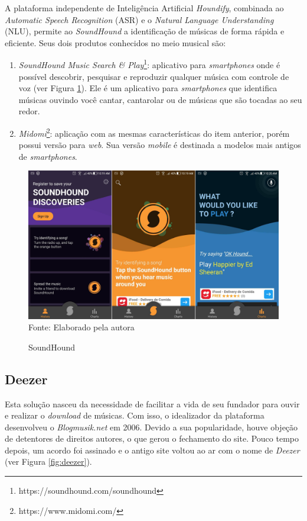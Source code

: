 A plataforma independente de Inteligência Artificial \textit{Houndify}, combinada ao \textit{Automatic Speech Recognition} (ASR) e o \textit{Natural Language Understanding} (NLU), permite ao \textit{SoundHound} a identificação de músicas de forma rápida e eficiente. Seus dois produtos conhecidos no meio musical são:

\begin{enumerate}
    \item \textit{SoundHound Music Search \& Play}\footnote{https://soundhound.com/soundhound}: aplicativo para \textit{smartphones} onde é possível descobrir, pesquisar e reproduzir qualquer música com controle de voz (ver Figura \ref{fig:soundHound}). Ele é um aplicativo para \textit{smartphones} que identifica músicas ouvindo você cantar, cantarolar ou de músicas que são tocadas ao seu redor.
    \item \textit{Midomi}\footnote{https://www.midomi.com/}: aplicação com as mesmas características do item anterior, porém possui versão para \textit{web}. Sua  versão \textit{mobile} é destinada a modelos mais antigos de \textit{smartphones}.
\end{enumerate}

\begin{figure}[!htb]
   \centering
   \caption{SoundHound}\label{fig:soundHound} 
   \includegraphics[scale=0.17]{figuras/soundhound.jpg}
   \\Fonte: Elaborado pela autora
\end{figure}

\subsection{Deezer} \label{subsec:deezer}
Esta solução nasceu da necessidade de facilitar a vida de seu fundador para ouvir e realizar o \textit{download} de músicas. Com isso, o idealizador da plataforma desenvolveu o \textit{Blogmusik.net} em 2006. Devido a sua popularidade, houve objeção de detentores de direitos autores, o que gerou o fechamento do site. Pouco tempo depois, um acordo foi assinado e o antigo site voltou ao ar com o nome de \textit{Deezer} (ver Figura \ref{fig:deezer}).

